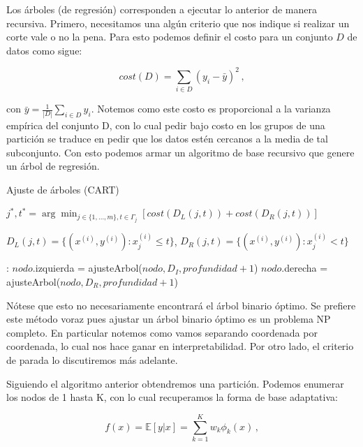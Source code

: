 Los árboles (de regresión) corresponden a ejecutar lo anterior de manera recursiva. Primero, necesitamos una algún criterio que nos indique si realizar un corte vale o no la pena. Para esto podemos definir el costo para un conjunto $D$ de datos como sigue:

\begin{equation}
    cost(D) = \sum_{i \in D} (y_i - \bar y)^2 \,,
\end{equation}

con $\bar y = \frac{1}{|D|} \sum_{i \in D} y_i $. Notemos como este costo es proporcional a la varianza empírica del conjunto D, con lo cual pedir bajo costo en los grupos de una partición se traduce en pedir que los datos estén cercanos a la media de tal subconjunto. Con esto podemos armar un algoritmo de base recursivo que genere un árbol de regresión.


\begin{algorithm}[H]
  \caption{Ajuste de árboles (CART)
    \label{alg:CART}}
  \begin{algorithmic}[1]
      \State $j^*, t^* = \arg\min_{j \in \{1,\dots,m\}, t \in \Gamma_j} \left[ cost(D_L(j,t)) + cost(D_R(j,t)) \right]$

        $D_L(j,t) = \{(x^{(i)}, y^{(i)}) : x_j^{(i)} \leq t \}$, $D_R(j,t) = \{(x^{(i)}, y^{(i)}) : x_j^{(i)} < t \}$
      
      :
      \Else
        \State $nodo$.izquierda = ajusteArbol($nodo, D_I, profundidad + 1$)
        \State $nodo$.derecha = ajusteArbol($nodo, D_R, profundidad + 1$)
        
      \EndIf
    \EndFunction
  \end{algorithmic}
\end{algorithm}

Nótese que esto no necesariamente encontrará el árbol binario óptimo. Se prefiere este método voraz pues ajustar un árbol binario óptimo es un problema NP completo. En particular notemos como vamos separando coordenada por coordenada, lo cual nos hace ganar en interpretabilidad. Por otro lado, el 
 criterio de parada lo discutiremos más adelante.

Siguiendo el algoritmo anterior obtendremos una partición. Podemos enumerar los nodos de 1 hasta K, con lo cual recuperamos la forma de base adaptativa:

\begin{equation}
    f(x) = \mathbb{E}[y | x] = \sum^K_{k=1} w_k \phi_k(x) \,,
\end{equation}

